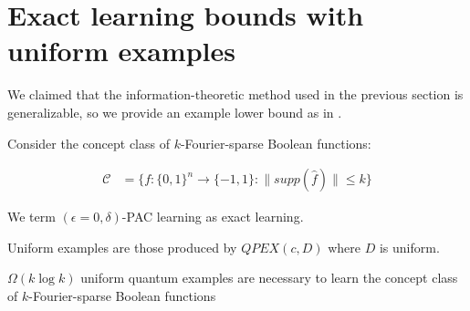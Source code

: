 \documentclass[main.tex]{subfiles}
\begin{document}
\section{Exact learning bounds with uniform examples}

We claimed that the information-theoretic method used in the previous section is generalizable, so we provide an example lower bound as in \cite{arunachalam2018two}.

Consider the concept class of $k$-Fourier-sparse Boolean functions:

\begin{align*}
\mathcal{C} &= \{ f: \{0, 1\}^n \rightarrow \{-1, 1\} 	: \|supp(\hat{f})\| \leq k\}
\end{align*}

\begin{definition}
We term $(\epsilon=0, \delta)$-PAC learning as exact learning.	
\end{definition}

\begin{definition}
Uniform examples are those produced by $QPEX(c,D)$ where $D$ is uniform.
\end{definition}


\begin{theorem}
$\Omega(k \log k)$ uniform quantum examples are necessary to learn the concept class of $k$-Fourier-sparse Boolean functions	
\end{theorem}
\end{document}
